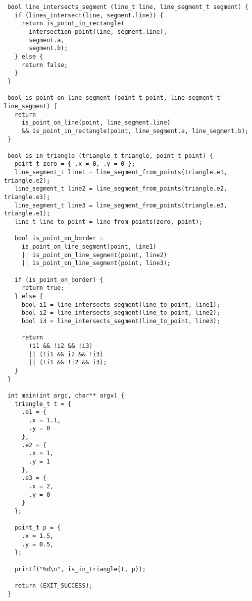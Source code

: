 \documentclass[a4paper,10pt]{article}
\begin{document}
\begin{lstlisting}
 bool line_intersects_segment (line_t line, line_segment_t segment) {
   if (lines_intersect(line, segment.line)) {
     return is_point_in_rectangle(
       intersection_point(line, segment.line),
       segment.a,
       segment.b);
   } else {
     return false;
   }
 }

 bool is_point_on_line_segment (point_t point, line_segment_t line_segment) {
   return
     is_point_on_line(point, line_segment.line)
     && is_point_in_rectangle(point, line_segment.a, line_segment.b);
 }

 bool is_in_triangle (triangle_t triangle, point_t point) {
   point_t zero = { .x = 0, .y = 0 };
   line_segment_t line1 = line_segment_from_points(triangle.e1, triangle.e2);
   line_segment_t line2 = line_segment_from_points(triangle.e2, triangle.e3);
   line_segment_t line3 = line_segment_from_points(triangle.e3, triangle.e1);
   line_t line_to_point = line_from_points(zero, point);
  
   bool is_point_on_border = 
     is_point_on_line_segment(point, line1)
     || is_point_on_line_segment(point, line2)
     || is_point_on_line_segment(point, line3);
  
   if (is_point_on_border) {
     return true;
   } else {
     bool i1 = line_intersects_segment(line_to_point, line1);
     bool i2 = line_intersects_segment(line_to_point, line2);
     bool i3 = line_intersects_segment(line_to_point, line3);

     return
       (i1 && !i2 && !i3)
       || (!i1 && i2 && !i3)
       || (!i1 && !i2 && i3);
   }
 }

 int main(int argc, char** argv) {
   triangle_t t = {
     .e1 = {
       .x = 1.1,
       .y = 0
     },
     .e2 = {
       .x = 1,
       .y = 1
     },
     .e3 = {
       .x = 2,
       .y = 0
     }
   };
  
   point_t p = {
     .x = 1.5,
     .y = 0.5,
   };
  
   printf("%d\n", is_in_triangle(t, p));

   return (EXIT_SUCCESS);
 }
\end{lstlisting}
\end{document}
